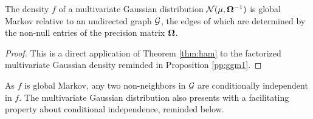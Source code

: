  \begin{prop}\label{pp:glob}
The density $f$ of a multivariate Gaussian distribution $\mathcal{N}(\mu, {\boldsymbol{\Omega}}^{-1})$ is global Markov relative to an undirected graph $\mathcal{G}$, the edges of which are determined by the non-null entries of the precision matrix ${\boldsymbol{\Omega}}$.
 \end{prop}
 \begin{proof}
 This is a direct application of Theorem \ref{thm:ham} to the factorized multivariate Gaussian density reminded in Proposition \ref{pp:ggm1}.
\end{proof} 

As $f$ is global Markov, any two non-neighbors in $\mathcal{G}$ are conditionally independent in $f$.  The multivariate Gaussian distribution also presents with a facilitating property about conditional independence, reminded below.
 
